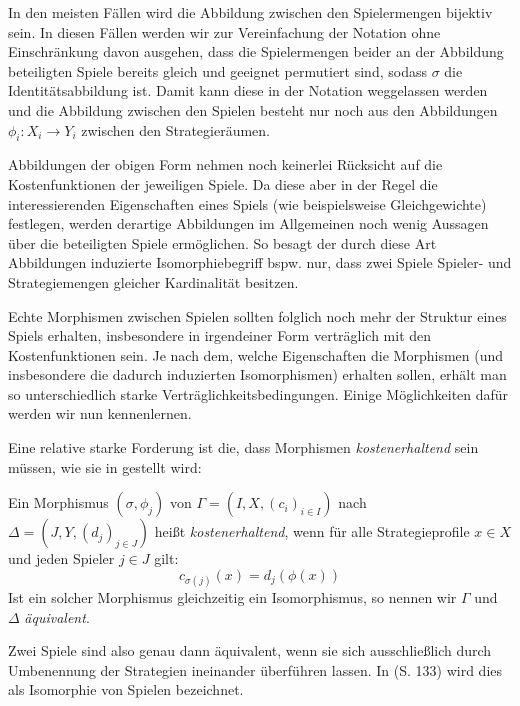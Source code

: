 \begin{notation}
	In den meisten Fällen wird die Abbildung zwischen den Spielermengen bijektiv sein. In diesen Fällen werden wir zur Vereinfachung der Notation ohne Einschränkung davon ausgehen, dass die Spielermengen beider an der Abbildung beteiligten Spiele bereits gleich und geeignet permutiert sind, sodass $\sigma$ die Identitätsabbildung ist. Damit kann diese in der Notation weggelassen werden und die Abbildung zwischen den Spielen besteht nur noch aus den Abbildungen $\phi_i: X_i \to Y_i$ zwischen den Strategieräumen.
\end{notation}

Abbildungen der obigen Form nehmen noch keinerlei Rücksicht auf die Kostenfunktionen der jeweiligen Spiele. Da diese aber in der Regel die interessierenden Eigenschaften eines Spiels (wie beispielsweise Gleichgewichte) festlegen, werden derartige Abbildungen im Allgemeinen noch wenig Aussagen über die beteiligten Spiele ermöglichen. So besagt der durch diese Art Abbildungen induzierte Isomorphiebegriff bspw. nur, dass zwei Spiele Spieler- und Strategiemengen gleicher Kardinalität besitzen.

Echte Morphismen zwischen Spielen sollten folglich noch mehr der Struktur eines Spiels erhalten, insbesondere in irgendeiner Form \glqq verträglich\grqq{} mit den Kostenfunktionen sein. Je nach dem, welche Eigenschaften die Morphismen (und insbesondere die dadurch induzierten Isomorphismen) erhalten sollen, erhält man so unterschiedlich starke Verträglichkeitsbedingungen. Einige Möglichkeiten dafür werden wir nun kennenlernen.

Eine relative starke Forderung ist die, dass Morphismen \emph{kostenerhaltend} sein müssen, wie sie in \cite{ReprOfFiniteGamesAsNCG} gestellt wird:

\begin{defn}
	Ein Morphismus $(\sigma, \phi_j)$ von $\Gamma = (I, X, (c_i)_{i\in I})$ nach $\Delta = (J, Y, (d_j)_{j\in J})$ heißt \emph{kostenerhaltend}, wenn für alle Strategieprofile $x \in X$ und jeden Spieler $j \in J$ gilt:
		\[c_{\sigma(j)}(x) = d_j(\phi(x)) \]
	Ist ein solcher Morphismus gleichzeitig ein Isomorphismus, so nennen wir $\Gamma$ und $\Delta$ \emph{äquivalent}.
\end{defn}

\begin{bem}
	Zwei Spiele sind also genau dann äquivalent, wenn sie sich ausschließlich durch Umbenennung der Strategien ineinander überführen lassen. In \cite{MonShap} (S. 133) wird dies als Isomorphie von Spielen bezeichnet.
\end{bem}

